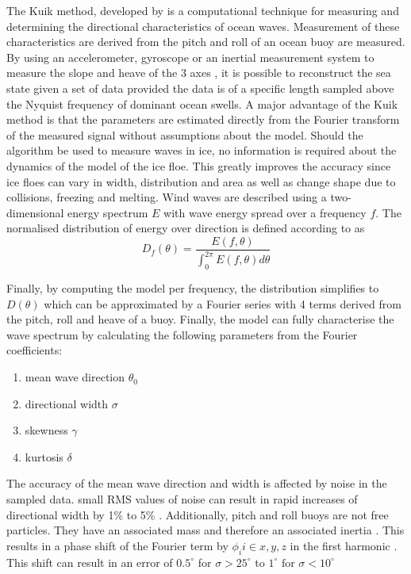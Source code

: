  The Kuik method, developed by \textcite{kuik1988method} is a computational technique for measuring and determining the directional characteristics of ocean waves. Measurement of these characteristics are derived from the pitch and roll of an ocean buoy are measured. By using an accelerometer, gyroscope or an inertial measurement system to measure the slope and heave of the 3 axes \cite{kuik1988method}, it is possible to reconstruct the sea state given a set of data provided the data is of a specific length sampled above the Nyquist frequency of dominant ocean swells. A major advantage of the Kuik method is that the parameters are estimated directly from the Fourier transform of the measured signal \cite{kuik1988method} without assumptions about the model. Should the algorithm be used to measure waves in ice, no information is required about the dynamics of the model of the ice floe. This greatly improves the accuracy since ice floes can vary in width, distribution and area as well as change shape due to collisions, freezing and melting. Wind waves are described using a two-dimensional energy spectrum $E$ with wave energy spread over a frequency $f$. The normalised distribution of energy over direction is defined according to \textcite{kuik1988method} as
 \begin{equation}
     D_f(\theta) = \frac{E(f,\theta)}{\int_0^{2
     \pi}E(f,\theta)d\theta}
 \end{equation} 
 
 Finally, by computing the model per frequency, the distribution simplifies to $D(\theta)$ which can be approximated by a Fourier series with 4 terms \cite{kuik1988method} derived from the pitch, roll and heave of a buoy. Finally, the model can fully characterise the wave spectrum by calculating the following parameters from the Fourier coefficients:
 
 \begin{enumerate}
    \item mean wave direction $\theta_0$
     \item directional width $\sigma$
     \item skewness $\gamma$
     \item kurtosis $\delta$ 
 \end{enumerate}

The accuracy of the mean wave direction and width is affected by noise in the sampled data. small RMS values of noise can result in rapid increases of directional width by 1\% to 5\% \cite{kuik1988method}. Additionally, pitch and roll buoys are not free particles. They have an associated mass and therefore an associated inertia \cite{kuik1988method}. This results in a phase shift of the Fourier term by $\phi_i i \in {x,y,z}$  in the first harmonic \cite{kuik1988method}. This shift can result in an error of $0.5^\circ $ for $\sigma > 25 ^\circ $ to $1^\circ \text{ for } \sigma < 10^\circ $ \cite{kuik1988method}   

